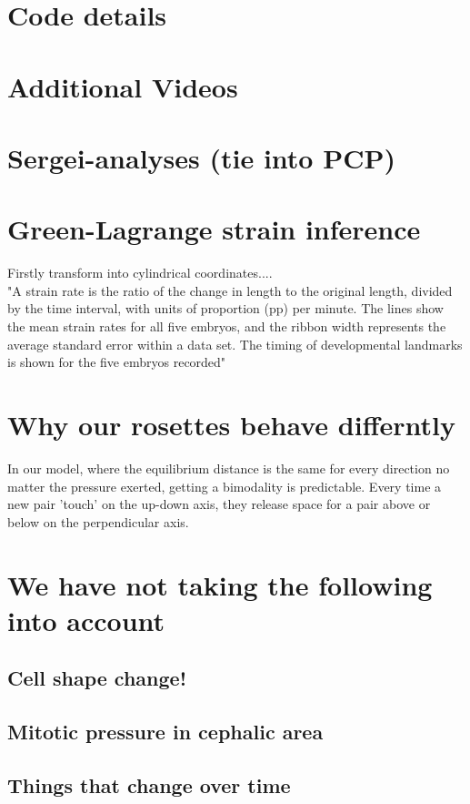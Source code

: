 \section{Code details}
\label{App:Code}
\section{Additional Videos}
\label{App:videos}
\section{Sergei-analyses (tie into PCP)}
\label{App:Sergei}

\section{Green-Lagrange strain inference}
\label{App:Strain-Calculation}
Firstly transform into cylindrical coordinates.... \\
"A strain rate is the ratio of the change in length to the original length, divided by the time interval, with units of proportion (pp) per minute. The lines show the mean strain rates for all five embryos, and the ribbon width represents the average standard error within a data set. The timing of developmental landmarks is shown for the five embryos recorded"\cite{butler2009cell}
\section{Why our rosettes behave differntly }
\label{App:why-rosettes}
In our model, where the equilibrium distance is the same for every direction no matter the pressure exerted, getting a bimodality is predictable.
Every time a new pair 'touch' on the up-down axis, they release space for a pair above or below on the perpendicular axis. 


\section{We have not taking the following into account}
\subsection*{Cell shape change!}
\subsection*{Mitotic pressure in cephalic area}
\subsection*{Things that change over time}
